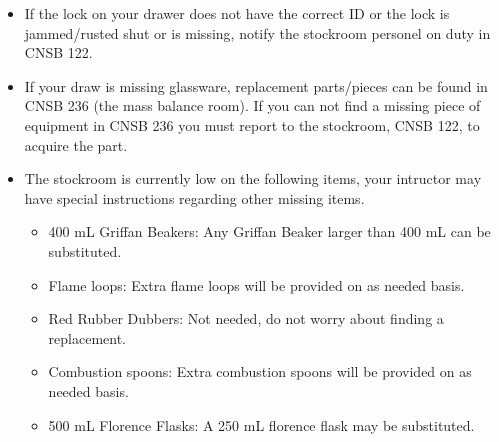 \documentclass[12pt]{article}
\begin{document}
\begin{itemize}
\item If the lock on your drawer does not have the correct ID or the lock is jammed/rusted shut or is missing, notify the stockroom personel on duty in CNSB 122.
\item If your draw is missing glassware, replacement parts/pieces can be found in CNSB 236 (the mass balance room). If you can not find a missing piece of equipment in CNSB 236 you must report to the stockroom, CNSB 122, to acquire the part.
\item The stockroom is currently low on the following items, your intructor may have special instructions regarding other missing items.
\begin{itemize}
\item 400 mL Griffan Beakers: Any Griffan Beaker larger than 400 mL can be substituted.
\item Flame loops: Extra flame loops will be provided on as needed basis.
\item Red Rubber Dubbers: Not needed, do not worry about finding a replacement.
\item Combustion spoons: Extra combustion spoons will be provided on as needed basis.
\item 500 mL Florence Flasks: A 250 mL florence flask may be substituted.
\end{itemize}
\end{itemize}
\end{document}

